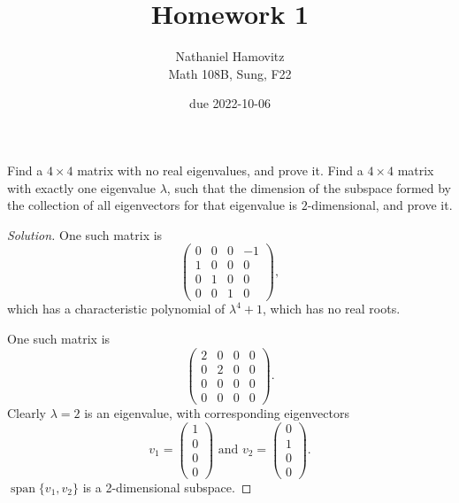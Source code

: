 \documentclass{article}
\DeclareMathOperator{\spann}{span}
\newenvironment{problem}[2][Problem]{\begin{trivlist}
\item[\hskip \labelsep {\bfseries #1}\hskip \labelsep {\bfseries #2.}]}{\end{trivlist}}
\newenvironment{solution}{\begin{proof}[Solution]}{\end{proof}}
\begin{document}


\title{Homework 1} %
\author{Nathaniel Hamovitz\\Math 108B, Sung, F22}
\date{due 2022-10-06}

\maketitle

\begin{problem}{1}
    Find a $4 \times 4$ matrix with no real eigenvalues, and prove it. Find a $4 \times 4$ matrix with exactly one
    eigenvalue $\lambda$, such that the dimension of the subspace formed by the collection of all eigenvectors
    for that eigenvalue is $2$-dimensional, and prove it.
\end{problem}

\begin{solution}
    One such matrix is 
    $$\begin{pmatrix}
        0 & 0 & 0 & -1 \\
        1 & 0 & 0 & 0 \\
        0 & 1 & 0 & 0 \\
        0 & 0 & 1 & 0
    \end{pmatrix},$$
    which has a characteristic polynomial of $\lambda^4 + 1$, which has no real roots.

    One such matrix is 
    $$\begin{pmatrix}
        2 & 0 & 0 & 0 \\
        0 & 2 & 0 & 0 \\
        0 & 0 & 0 & 0 \\
        0 & 0 & 0 & 0 
    \end{pmatrix}.$$
    Clearly $\lambda = 2$ is an eigenvalue, with corresponding eigenvectors
    $$v_1 = \begin{pmatrix}
        1 \\ 0 \\ 0 \\ 0
    \end{pmatrix} \text{ and } 
    v_2 = \begin{pmatrix}
        0 \\ 1 \\ 0 \\ 0
    \end{pmatrix}.$$
    $\spann\{v_1, v_2\}$ is a 2-dimensional subspace.
\end{solution}
\end{document}
